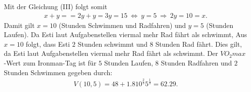 Mit der Gleichung (III) folgt somit
\begin{align*}
	x + y = = 2y + y = 3y =  15
	\ \Leftrightarrow \
	y = 5
	\ \Rightarrow \ 2y = 10 = x.
\end{align*}
Damit gilt $x = 10 $ (Stunden Schwimmen und Radfahren) und $y= 5$ (Stunden Laufen).
Da Esti laut Aufgabenstellen viermal mehr Rad fährt als schwimmt, 
Aus $x = 10$ folgt, dass Esti $2 $ Stunden schwimmt und $8$ Stunden Rad fährt.
Dies gilt, da Esti laut Aufgabenstellen viermal mehr Rad fährt als schwimmt.
Der $VO_2max$-Wert zum Ironman-Tag ist für $5$ Stunden Laufen, $8$ Stunden Radfahren und $2$ Stunden Schwimmen gegeben durch:
\begin{align*}
	V(10,5)
	= 
	48 + 1.8 10^{\frac{2}{3} } 5^{\frac{1}{3}}
	=
	62.29.
\end{align*}
\newpage


